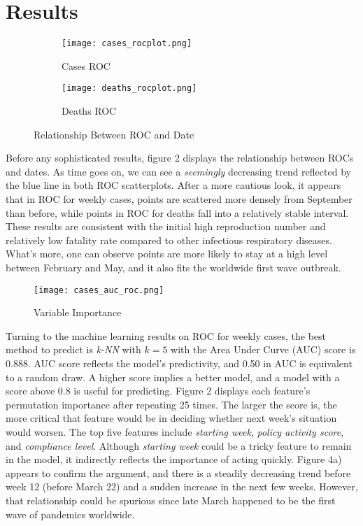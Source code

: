 \documentclass[12pt]{class}
\begin{document}
\section*{Results}
\begin{figure}[h]
\begin{subfigure}{0.5\textwidth}
  \texttt{[image: cases\_rocplot.png]}
  \caption{Cases ROC}
  \label{fig:subim1}
\end{subfigure}
\begin{subfigure}{0.5\textwidth}
  \texttt{[image: deaths\_rocplot.png]}
  \caption{Deaths ROC}
  \label{fig:subim2}
\end{subfigure}
\caption{Relationship Between ROC and Date}
\label{fig:image2}
\end{figure}
Before any sophisticated results, figure 2 displays the relationship between ROCs and dates. As time goes on, we can see a \textit{seemingly} decreasing trend reflected by the blue line in both ROC scatterplots. After a more cautious look, it appears that in ROC for weekly cases, points are scattered more densely from September than before, while points in ROC for deaths fall into a relatively stable interval. These results are consistent with the initial high reproduction number and relatively low fatality rate compared to other infectious respiratory diseases. What’s more, one can observe points are more likely to stay at a high level between February and May, and it also fits the worldwide first wave outbreak.\par 
\begin{figure}
    \centering
    \texttt{[image: cases\_auc\_roc.png]}
    \caption{Variable Importance}
    \label{fig:my_label}
\end{figure}
Turning to the machine learning results on ROC for weekly cases, the best method to predict is \textit{k-NN} with $k=5$ with the Area Under Curve (AUC) score is 0.888. AUC score reflects the model’s predictivity, and 0.50 in AUC is equivalent to a random draw. A higher score implies a better model, and a model with a score above 0.8 is useful for predicting. Figure 2 displays each feature’s permutation importance after repeating 25 times. The larger the score is, the more critical that feature would be in deciding whether next week’s situation would worsen. The top five features include \textit{starting week}, \textit{policy activity score}, and \textit{compliance level}. Although \textit{starting week} could be a tricky feature to remain in the model, it indirectly reflects the importance of acting quickly.  Figure 4a) appears to confirm the argument, and there is a steadily decreasing trend before week 12 (before March 22) and a sudden increase in the next few weeks. However, that relationship could be spurious since late March happened to be the first wave of pandemics worldwide.\par 
\end{document}
